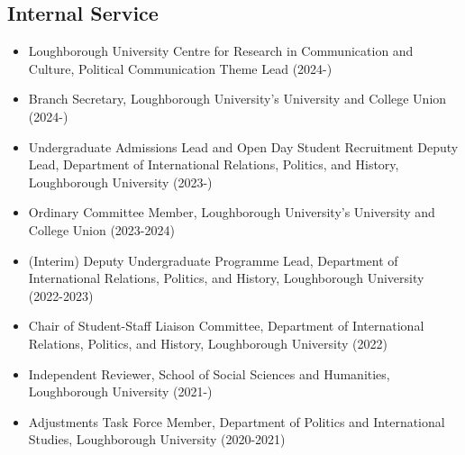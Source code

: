 \documentclass[letterpaper,fontsize=10.5pt]{scrartcl}
\begin{document}
\subsection{Internal Service}
\begin{itemize}[itemsep=0em, topsep=0em, partopsep=0em]
	\item Loughborough University Centre for Research in Communication and Culture, Political Communication Theme Lead (2024-)
	\item Branch Secretary, Loughborough University's University and College Union (2024-)
	\item Undergraduate Admissions Lead and Open Day Student Recruitment Deputy Lead, Department of International Relations, Politics, and History, Loughborough University (2023-)
	\item Ordinary Committee Member, Loughborough University's University and College Union (2023-2024)
	\item (Interim) Deputy Undergraduate Programme Lead, Department of International Relations, Politics, and History, Loughborough University (2022-2023)
	\item Chair of Student-Staff Liaison Committee, Department of International Relations, Politics, and History, Loughborough University (2022)
	\item Independent Reviewer, School of Social Sciences and Humanities, Loughborough University (2021-)
	\item Adjustments Task Force Member, Department of Politics and International Studies, Loughborough University (2020-2021)\\
\end{itemize}
\end{document}
